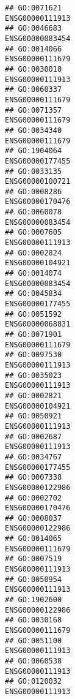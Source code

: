 \documentclass[
]{article}
\begin{document}
\begin{verbatim}
## GO:0071621                                                 ENSG00000111913
## GO:0046683                                                 ENSG00000083454
## GO:0014066                                                 ENSG00000111679
## GO:0030010                                                 ENSG00000111913
## GO:0060337                                                 ENSG00000111679
## GO:0071357                                                 ENSG00000111679
## GO:0034340                                                 ENSG00000111679
## GO:1904064                                                 ENSG00000177455
## GO:0033135                                                 ENSG00000100721
## GO:0008286                                                 ENSG00000170476
## GO:0060078                                                 ENSG00000083454
## GO:0007605                                                 ENSG00000111913
## GO:0002824                                                 ENSG00000104921
## GO:0014074                                                 ENSG00000083454
## GO:0045834                                                 ENSG00000177455
## GO:0051592                                                 ENSG00000068831
## GO:0071901                                                 ENSG00000111679
## GO:0097530                                                 ENSG00000111913
## GO:0035023                                                 ENSG00000111913
## GO:0002821                                                 ENSG00000104921
## GO:0050921                                                 ENSG00000111913
## GO:0002687                                                 ENSG00000111913
## GO:0034767                                                 ENSG00000177455
## GO:0007338                                                 ENSG00000122986
## GO:0002702                                                 ENSG00000170476
## GO:0008037                                                 ENSG00000122986
## GO:0014065                                                 ENSG00000111679
## GO:0007519                                                 ENSG00000111913
## GO:0050954                                                 ENSG00000111913
## GO:1902600                                                 ENSG00000122986
## GO:0030168                                                 ENSG00000111679
## GO:0051100                                                 ENSG00000111913
## GO:0060538                                                 ENSG00000111913
## GO:0120032                                                 ENSG00000111913

\end{verbatim}
\end{document}
